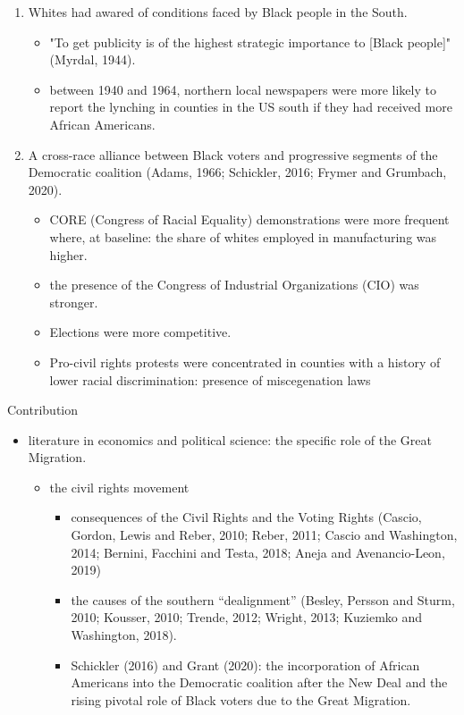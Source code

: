 \documentclass[dvipdfmx,11pt]{beamer}
\begin{document}
\begin{frame}{}
  \begin{enumerate}
    \item Whites had awared of conditions faced by Black people in the South.
    \begin{itemize}
      \item "To get publicity is of the highest strategic
      importance to [Black people]" (Myrdal, 1944).
      \item between 1940 and 1964, northern local newspapers were more likely to report the lynching in counties in the US south if they had received more African Americans.
    \end{itemize}
    \item A cross-race alliance between Black voters and progressive segments of the Democratic coalition (Adams, 1966; Schickler, 2016; Frymer and Grumbach, 2020).
    \begin{itemize}
      \item CORE (Congress of
      Racial Equality) demonstrations were more frequent where, at baseline: the share of whites employed in manufacturing was higher.
      \item the presence of the Congress of Industrial Organizations (CIO) was stronger.
      \item Elections were more competitive.
      \item Pro-civil rights protests were concentrated in counties with a history of lower racial discrimination: presence of miscegenation laws
    \end{itemize}
  \end{enumerate}
\end{frame}

\begin{frame}{Contribution}
  \begin{itemize}
    \item literature in economics and political science: the specific role of the Great Migration.
    \begin{itemize}
      \item the civil rights movement
      \begin{itemize}
        \item consequences of the Civil Rights and the Voting Rights (Cascio, Gordon, Lewis and Reber, 2010; Reber, 2011; Cascio and Washington, 2014; Bernini, Facchini and Testa, 2018; Aneja and Avenancio-Leon, 2019)
        \item the causes of the southern “dealignment” (Besley, Persson and Sturm, 2010; Kousser, 2010; Trende, 2012; Wright, 2013; Kuziemko and Washington, 2018).
        \item Schickler (2016) and Grant (2020): the incorporation of African Americans into the Democratic coalition after the New Deal and the rising pivotal role of Black voters due to the Great Migration.
      \end{itemize}
    \end{itemize}
  \end{itemize}
\end{frame}
\end{document}
